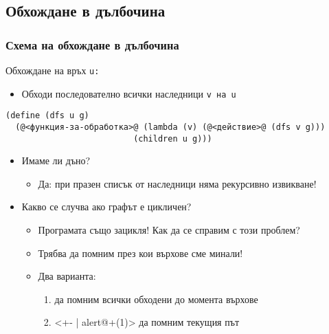 \documentclass[alsotrans]{beamerswitch}
\begin{document}
\subsection{Обхождане в дълбочина}

\begin{frame}[fragile]
  \frametitle{Схема на обхождане в дълбочина}

  Обхождане на връх \tt u:
  \begin{itemize}
  \item Обходи последователно всички наследници \tt v на \tt u
  \end{itemize}
  \pause
{\small
\begin{lstlisting}
(define (dfs u g)
  (@<функция-за-обработка>@ (lambda (v) (@<действие>@ (dfs v g)))
                          (children u g)))
\end{lstlisting}
}
  \pause
  \begin{itemize}[<+->]
  \item \alert{Имаме ли дъно?}
    \begin{itemize}
    \item Да:  при празен списък от наследници няма рекурсивно извикване!
    \end{itemize}
  \item \alert{Какво се случва ако графът е цикличен?}
    \begin{itemize}
    \item Програмата също зацикля! Как да се справим с този проблем?
    \item Трябва да помним през кои върхове сме минали!
    \item Два варианта:
      \begin{enumerate}
      \item да помним всички обходени до момента върхове
      \item<+- | alert@+(1)> да помним текущия път
      \end{enumerate}
    \end{itemize}
  \end{itemize}
\end{frame}
\end{document}
